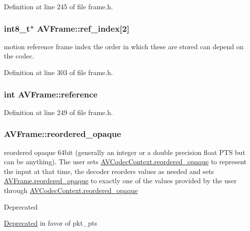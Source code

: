 Definition at line 245 of file frame.\+h.

\subsubsection[{\texorpdfstring{ref\+\_\+index}{ref_index}}]{ {\bf int8\+\_\+t}$\ast$ A\+V\+Frame\+::ref\+\_\+index\mbox{[}2\mbox{]}}\hypertarget{struct_a_v_frame_adb15f47de298b11de31f279a8652f73d}{}\label{struct_a_v_frame_adb15f47de298b11de31f279a8652f73d}
motion reference frame index the order in which these are stored can depend on the codec. 

Definition at line 303 of file frame.\+h.

\subsubsection[{\texorpdfstring{reference}{reference}}]{ {\bf int} A\+V\+Frame\+::reference}\hypertarget{struct_a_v_frame_a20e4db6c5f6832bf290ed36dc7b42fa8}{}\label{struct_a_v_frame_a20e4db6c5f6832bf290ed36dc7b42fa8}


Definition at line 249 of file frame.\+h.

\subsubsection[{\texorpdfstring{reordered\+\_\+opaque}{reordered_opaque}}]{ A\+V\+Frame\+::reordered\+\_\+opaque}\hypertarget{struct_a_v_frame_ab54a78c51318c8c678e545b1f3d6fddd}{}\label{struct_a_v_frame_ab54a78c51318c8c678e545b1f3d6fddd}
reordered opaque 64bit (generally an integer or a double precision float P\+TS but can be anything). The user sets \hyperlink{struct_a_v_codec_context_a64c09907902b41744c3ea60c89fd42fb}{A\+V\+Codec\+Context.\+reordered\+\_\+opaque} to represent the input at that time, the decoder reorders values as needed and sets \hyperlink{struct_a_v_frame_ab54a78c51318c8c678e545b1f3d6fddd}{A\+V\+Frame.\+reordered\+\_\+opaque} to exactly one of the values provided by the user through \hyperlink{struct_a_v_codec_context_a64c09907902b41744c3ea60c89fd42fb}{A\+V\+Codec\+Context.\+reordered\+\_\+opaque} \begin{DoxyRefDesc}{Deprecated}
\item[\hyperlink{deprecated__deprecated000025}{Deprecated}]in favor of pkt\+\_\+pts \end{DoxyRefDesc}


